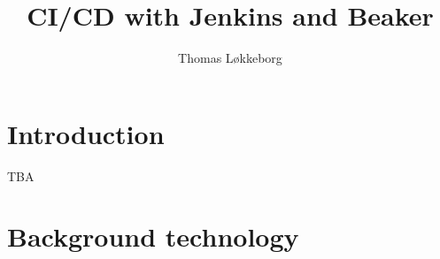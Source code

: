 

\title{CI/CD with Jenkins and Beaker}
\author{Thomas Løkkeborg} %



\maketitle


\thispagestyle{empty}

\clearpage
{}
\setcounter{page}{1}
\tableofcontents

\clearpage
{}

\section{Introduction}

TBA

%
%
%
%
%
%

\section{Background technology}

